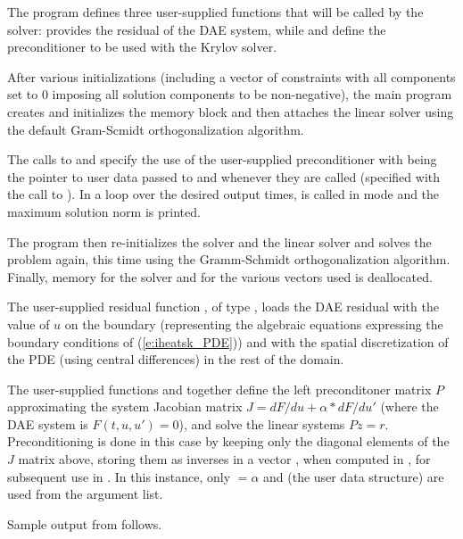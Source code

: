 The program defines three user-supplied functions that will be called by the
{\ida} solver:  provides the residual of the DAE system, while
 and  define the preconditioner to be used
with the Krylov solver.

After various initializations (including a vector of constraints with all components
set to $0$ imposing all solution components to be non-negative), the main program
creates and initializes the {\ida} memory block and then attaches the {\idaspgmr} linear
solver using the default  Gram-Scmidt orthogonalization algorithm. 

The calls to  and  specify
the use of the user-supplied preconditioner with  being the pointer to user data
passed to  and  whenever they are called (specified 
with the call to ).
In a loop over the desired output times,  is called in 
mode and the maximum solution norm is printed.

The  program then re-initializes the {\ida} solver and the {\idaspgmr} linear 
solver and solves the problem again, this time using the  Gramm-Schmidt
orthogonalization algorithm.
Finally, memory for the {\ida} solver and for the various vectors used is deallocated.

The user-supplied residual function , of type , loads the DAE
residual with the value of $u$ on the boundary (representing the algebraic equations
expressing the boundary conditions of (\ref{e:iheatsk_PDE})) and with the 
spatial discretization of the PDE (using central differences) in the rest of the domain.

The user-supplied functions  and  together define the 
left preconditoner matrix $P$ approximating the system Jacobian matrix               
$J = dF/du + \alpha*dF/du'$ (where the DAE system is $F(t,u,u') = 0$), and solve the linear   
systems $P z = r$.   
Preconditioning  is done in this case by keeping only the diagonal elements of 
the $J$ matrix above, storing them as inverses in a vector , when computed in 
, for subsequent use in .                                 
In this instance, only  $=\alpha$ and  (the user data structure) are 
used from the  argument list.      

Sample output from  follows.
